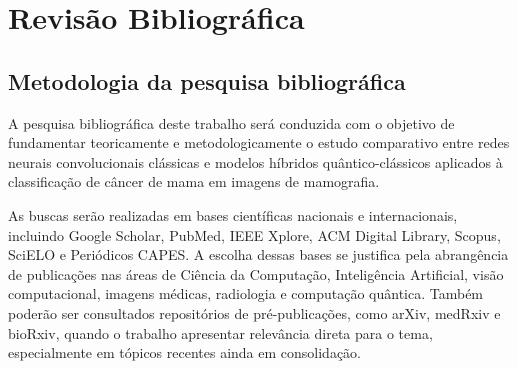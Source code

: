\documentclass[
    12pt,
    openright,
    oneside,
    a4paper,
    english,
    brazil
]{abntex2}
\begin{document}


\chapter{Revisão Bibliográfica}

\section{Metodologia da pesquisa bibliográfica}

A pesquisa bibliográfica deste trabalho será conduzida com o objetivo de fundamentar teoricamente e metodologicamente o estudo comparativo entre redes neurais convolucionais clássicas e modelos híbridos quântico-clássicos aplicados à classificação de câncer de mama em imagens de mamografia.

As buscas serão realizadas em bases científicas nacionais e internacionais, incluindo Google Scholar, PubMed, IEEE Xplore, ACM Digital Library, Scopus, SciELO e Periódicos CAPES. A escolha dessas bases se justifica pela abrangência de publicações nas áreas de Ciência da Computação, Inteligência Artificial, visão computacional, imagens médicas, radiologia e computação quântica. Também poderão ser consultados repositórios de pré-publicações, como arXiv, medRxiv e bioRxiv, quando o trabalho apresentar relevância direta para o tema, especialmente em tópicos recentes ainda em consolidação.
\end{document}
